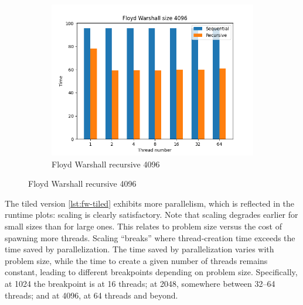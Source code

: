 \documentclass{article}
\newcommand{\eng}[1]{#1}
\begin{document}
\begin{figure}[h]
\begin{subfigure}{0.49\textwidth}
        \includegraphics[width=\textwidth]{a2/plots/fw_4096.png}
        \caption{\eng{Floyd Warshall} recursive 4096}
    \end{subfigure}
\end{figure}

The \eng{tiled} version \ref{lst:fw-tiled} exhibits more parallelism, which is reflected in the runtime plots: scaling is clearly satisfactory. Note that scaling degrades earlier for small sizes than for large ones. This relates to problem size versus the cost of spawning more \eng{threads}. Scaling “breaks” where thread-creation time exceeds the time saved by parallelization. The time saved by parallelization varies with problem size, while the time to create a given number of threads remains constant, leading to different breakpoints depending on problem size. Specifically, at 1024 the breakpoint is at 16 threads; at 2048, somewhere between 32–64 threads; and at 4096, at 64 threads and beyond.
\end{document}
